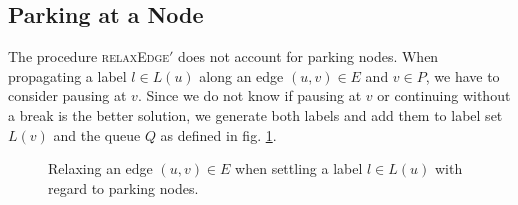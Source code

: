 \subsection{Parking at a Node}
The procedure \textsc{relaxEdge$'$} does not account for parking nodes. When propagating a label $l \in L(u)$ along an edge $(u,v) \in E$ and $v \in P$, we have to consider pausing at $v$. Since we do not know if pausing at $v$ or continuing without a break is the better solution, we generate both labels and add them to label set $L(v)$ and the queue $Q$ as defined in fig. \ref{alg:relax_edge}.

\begin{figure}[hbtp]
	\setlength{\interspacetitleruled}{0pt}%
	\setlength{\algotitleheightrule}{0pt}%
	\begin{algorithm*}[H]
		\DontPrintSemicolon



	\end{algorithm*}
	\setlength{\interspacetitleruled}{2pt}%
	\setlength{\algotitleheightrule}{\algotitleheightruledefault}%

	\caption{\label{alg:relax_edge}Relaxing an edge $(u,v) \in E$ when settling a label $l \in L(u)$ with regard to parking nodes.}
\end{figure}

